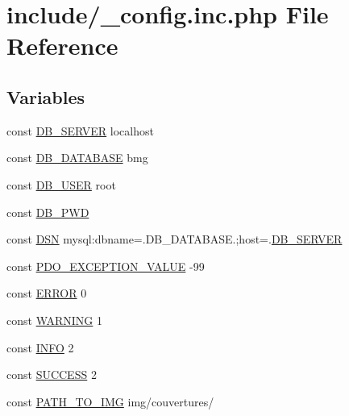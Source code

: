 \hypertarget{__config_8inc_8php}{}\section{include/\+\_\+config.inc.\+php File Reference}
\label{__config_8inc_8php}
\subsection*{Variables}
\begin{DoxyCompactItemize}
\item 
const \hyperlink{__config_8inc_8php_a046861af9c950733d95478526a7e19ae}{D\+B\+\_\+\+S\+E\+R\+V\+ER} \textquotesingle{}localhost\textquotesingle{}
\item 
const \hyperlink{__config_8inc_8php_a4798f8ff41893eb12308c2b638b8becf}{D\+B\+\_\+\+D\+A\+T\+A\+B\+A\+SE} \textquotesingle{}bmg\textquotesingle{}
\item 
const \hyperlink{__config_8inc_8php_a1d1d99f8e08f387d84fe9848f3357156}{D\+B\+\_\+\+U\+S\+ER} \textquotesingle{}root\textquotesingle{}
\item 
const \hyperlink{__config_8inc_8php_aad02562159d6a188743345c0d6ac4cf5}{D\+B\+\_\+\+P\+WD} \textquotesingle{}\textquotesingle{}
\item 
const \hyperlink{__config_8inc_8php_a0b4365dc3cc0e967808cd7034a971d0c}{D\+SN} \textquotesingle{}mysql\+:dbname=\textquotesingle{}.D\+B\+\_\+\+D\+A\+T\+A\+B\+A\+S\+E.\textquotesingle{};host=\textquotesingle{}.\hyperlink{__config_8inc_8php_a046861af9c950733d95478526a7e19ae}{D\+B\+\_\+\+S\+E\+R\+V\+ER}
\item 
const \hyperlink{__config_8inc_8php_a44519cc820c3dfe4b7ae4787899fa2bc}{P\+D\+O\+\_\+\+E\+X\+C\+E\+P\+T\+I\+O\+N\+\_\+\+V\+A\+L\+UE} -\/99
\item 
const \hyperlink{__config_8inc_8php_a7f79d7b73cfb40bb7855d4260393cc0f}{E\+R\+R\+OR} 0
\item 
const \hyperlink{__config_8inc_8php_ad0c7ccd2f8b92a760391d21d0ec7b339}{W\+A\+R\+N\+I\+NG} 1
\item 
const \hyperlink{__config_8inc_8php_af2d1bd27ecbe33ecaadb558404e9c669}{I\+N\+FO} 2
\item 
const \hyperlink{__config_8inc_8php_a2bc61f90ca5d5a1f79769d1d9e38842b}{S\+U\+C\+C\+E\+SS} 2
\item 
const \hyperlink{__config_8inc_8php_a801d3a3d70857266cb8b9c6515a18dab}{P\+A\+T\+H\+\_\+\+T\+O\+\_\+\+I\+MG} \textquotesingle{}img/couvertures/\textquotesingle{}

\end{DoxyCompactItemize}
